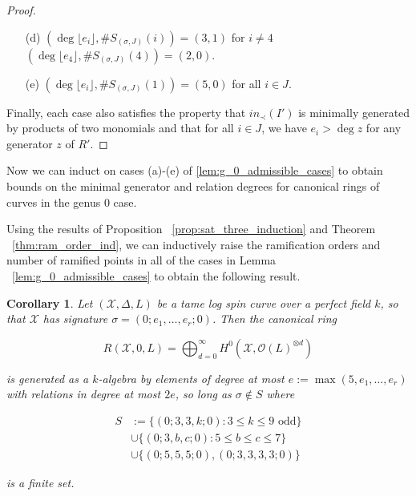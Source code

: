 \documentclass{amsart}
\theoremstyle{plain}
\newtheorem{cor}[thm]{Corollary}
\theoremstyle{definition}
\theoremstyle{remark}
\numberwithin{equation}{section}
\newcommand \sx{\mathscr X}
\newcommand\sco{{\mathscr O}}
\begin{document}
\begin{proof}
\begin{enumerate}
	\item[(d)] $(\deg \lfloor e_i \rfloor, \#S_{(\sigma, J)}(i)) = (3, 1)$
		for $i \neq 4$ \\
		$(\deg \lfloor e_4 \rfloor, \#S_{(\sigma, J)}(4))	= (2, 0)$.

	\item[(e)] $(\deg \lfloor e_i \rfloor, \#S_{(\sigma, J)}(1)) = (5, 0)$
		for all $i \in J$.
\end{enumerate}

Finally, each case also satisfies the property that $in_\prec(I')$ is
minimally generated by products of two monomials and that for all
$i \in J$, we have $e_i > \deg z$ for any generator $z$ of $R'.$
\end{proof}

Now we can induct on cases (a)-(e) of \ref{lem:g_0_admissible_cases}
to obtain bounds on the minimal generator and relation degrees for
canonical rings of curves in the genus 0 case.

Using the results of Proposition ~\ref{prop:sat_three_induction}
and Theorem ~\ref{thm:ram_order_ind}, we can inductively raise
the ramification orders and number of ramified points in all of the
cases in Lemma ~\ref{lem:g_0_admissible_cases} to obtain the following
result.

\begin{cor}
\label{cor:g_0_gen_rel_base_cases}
Let $(\sx, \Delta, L)$ be a tame log spin curve over a perfect field $k$, so
that $\sx$ has signature $\sigma = (0; e_1, \ldots, e_r; 0)$. Then the
canonical ring

\[
	R(\sx, 0, L) = \bigoplus_{d = 0}^\infty H^0(\sx, \sco(L)^{\otimes d})
\]

\noindent
is generated as a $k$-algebra by elements of degree at most $e := 
\max(5, e_1, \ldots, e_r)$ with relations in degree at most $2e$, so 
long as $\sigma \notin S$ where

\begin{align*}
	S &:= \{(0; 3, 3, k; 0) : 3 \leq k \leq 9 \text{ odd}\} \\
		&\cup \{(0; 3, b, c; 0) : 5 \leq b \leq c \leq 7\} \\
		&\cup \{(0; 5, 5, 5; 0), (0; 3, 3, 3, 3; 0)\}
\end{align*}

\noindent
is a finite set.
\end{cor}
\end{document}
